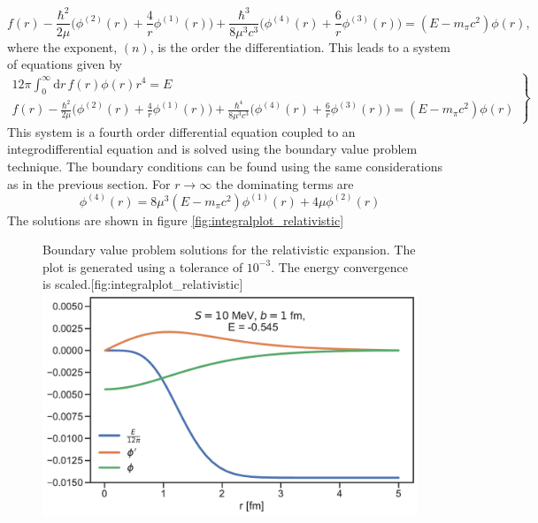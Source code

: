  \begin{equation}
    f(r)-\frac{\hbar^2}{2\mu}\bigg( \phi^{(2)}(r)+\frac{4}{r}\phi^{(1)}(r) \bigg)+\frac{\hbar^3}{8\mu^3 c^3}\bigg(\phi^{(4)}(r)+\frac{6}{r}\phi^{(3)}(r)\bigg)=(E-m_\pi c^2)\phi(r),
 \end{equation}
 where the exponent, $(n)$, is the order the differentiation. This leads to a system of equations given by
 \begin{equation} \label{systemrel}
 \left.
    \begin{array}{ll}
            12\pi \int_0^\infty  \text{d}r \, f(r) \phi(r) r^4  = E \\
               f(r)-\frac{\hbar^2}{2\mu}\big( \phi^{(2)}(r)+\frac{4}{r}\phi^{(1)}(r) \big)+\frac{\hbar^4}{8\mu^3 c^3}\big(\phi^{(4)}(r)+\frac{6}{r}\phi^{(3)}(r)\big)=(E-m_\pi c^2)\phi(r)
    \end{array}
\right \} 
\end{equation}
This system is a fourth order differential equation coupled to an integrodifferential equation and is solved using the boundary value problem technique. The boundary conditions can be found using the same considerations as in the previous section. For $r\rightarrow \infty$ the dominating terms are 
\begin{equation}
    \phi^{(4)}(r) = 8\mu^3(E-m_\pi c^2) \phi^{(1)}(r)+4\mu \phi^{(2)}(r)
\end{equation}
The solutions are shown in figure \ref{fig:integralplot_relativistic}
\begin{figure}[H]
    \begin{sidecaption}{Boundary value problem solutions for the relativistic expansion. The plot is generated using a tolerance of $10^{-3}$. The energy convergence is scaled.}[fig:integralplot_relativistic]
    \includegraphics[width=\linewidth]{Figures/Integralplot_relativistic.pdf}
    \end{sidecaption}
\end{figure}

